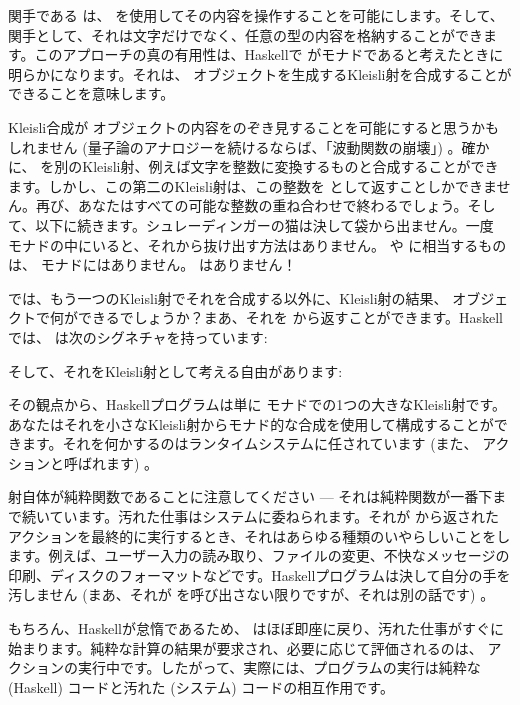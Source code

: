 関手である  は、 を使用してその内容を操作することを可能にします。そして、関手として、それは文字だけでなく、任意の型の内容を格納することができます。このアプローチの真の有用性は、Haskellで  がモナドであると考えたときに明らかになります。それは、 オブジェクトを生成するKleisli射を合成することができることを意味します。

Kleisli合成が  オブジェクトの内容をのぞき見することを可能にすると思うかもしれません (量子論のアナロジーを続けるならば、「波動関数の崩壊」) 。確かに、 を別のKleisli射、例えば文字を整数に変換するものと合成することができます。しかし、この第二のKleisli射は、この整数を  として返すことしかできません。再び、あなたはすべての可能な整数の重ね合わせで終わるでしょう。そして、以下に続きます。シュレーディンガーの猫は決して袋から出ません。一度  モナドの中にいると、それから抜け出す方法はありません。  や  に相当するものは、 モナドにはありません。 はありません！

では、もう一つのKleisli射でそれを合成する以外に、Kleisli射の結果、 オブジェクトで何ができるでしょうか？まあ、それを  から返すことができます。Haskellでは、 は次のシグネチャを持っています: 

そして、それをKleisli射として考える自由があります: 

その観点から、Haskellプログラムは単に  モナドでの1つの大きなKleisli射です。あなたはそれを小さなKleisli射からモナド的な合成を使用して構成することができます。それを何かするのはランタイムシステムに任されています (また、 アクションと呼ばれます) 。

射自体が純粋関数であることに注意してください --- それは純粋関数が一番下まで続いています。汚れた仕事はシステムに委ねられます。それが  から返された  アクションを最終的に実行するとき、それはあらゆる種類のいやらしいことをします。例えば、ユーザー入力の読み取り、ファイルの変更、不快なメッセージの印刷、ディスクのフォーマットなどです。Haskellプログラムは決して自分の手を汚しません (まあ、それが  を呼び出さない限りですが、それは別の話です) 。

もちろん、Haskellが怠惰であるため、 はほぼ即座に戻り、汚れた仕事がすぐに始まります。純粋な計算の結果が要求され、必要に応じて評価されるのは、 アクションの実行中です。したがって、実際には、プログラムの実行は純粋な (Haskell) コードと汚れた (システム) コードの相互作用です。

